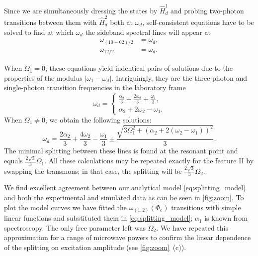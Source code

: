 \documentclass[%
 pra,
 amsmath,amssymb,
 reprint,%
]{revtex4-1}
\begin{document}
Since we are simultaneously dressing the states by $\hat H_d^1$ and probing two-photon transitions between them with $\hat H_d^2$ both at $\omega_d$, self-consistent equations have to be solved to find at which $\omega_d$ the sideband spectral lines will appear at
\begin{equation}
\begin{aligned}
\omega_{(10-02)/2} &= \omega_d,\\
\omega_{12/2} &= \omega_d.
\end{aligned}
\label{eq:two-photon}
\end{equation}

When $\Omega_1 = 0$, these equations yield indentical pairs of solutions due to the properties of the modulus $|\omega_1 - \omega_d|$. Intriguingly, they are the three-photon and single-photon transition frequencies in the laboratory frame
\begin{equation}
\omega_d = \begin{cases} \frac{\alpha_2}{3} + \frac{2 \omega_{2}}{3} + \frac{\omega_{1}}{3}, \\ \alpha_2 + 2 \omega_{2} - \omega_{1}.\end{cases}
\end{equation}
When $\Omega_1 \neq 0$, we obtain the following solutions:
\begin{equation}
\omega_d = \frac{2 \alpha_2}{3} + \frac{4 \omega_{2}}{3} - \frac{\omega_{1}}{3} \pm \frac{\sqrt{3 \Omega_{1}^{2} + \left( \alpha_2 + 2 (\omega_{2} - \omega_{1})\right)^{2}}}{3}.
\label{eq:splitting_model}
\end{equation}
The minimal splitting between these lines is 
found at the resonant point and equals $\frac{2 
\sqrt{3}}{{3}} \Omega_1$. All these calculations 
may be repeated exactly for the feature II by 
swapping the transmons; in that case, the 
splitting will be $\frac{2 \sqrt{3}}{{3}} 
\Omega_2$.

We find excellent agreement between our 
analytical model \autoref{eq:splitting_model} and 
both the experimental and simulated data as can 
be seen in \autoref{fig:zoom}. To plot the model 
curves we have fitted the 
$\omega_{(1,2)}(\Phi_e)$ transitions with simple 
linear functions and substituted them in 
\autoref{eq:splitting_model}; $\alpha_1$ is known 
from spectroscopy. The only free parameter left 
was $\Omega_2$. We have repeated this 
approximation for a range of microwave powers to 
confirm the linear dependence of the splitting on 
excitation amplitude (see \autoref{fig:zoom}~(c)).
\end{document}
